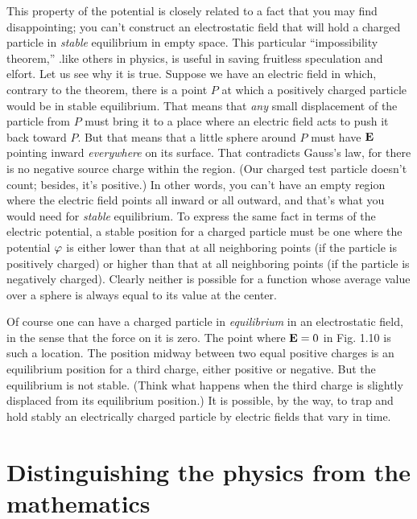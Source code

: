 This property of the potential is closely related to a fact that you
may find disappointing; you can't construct an electrostatic field that
will hold a charged particle in \emph{stable} equilibrium in empty space.
This particular ``impossibility theorem,'' .like others in physics, is
useful in saving fruitless speculation and elfort. Let us see why it
is true. Suppose we have an electric field in which, contrary to the
theorem, there is a point $P$ at which a positively charged particle
would be in stable equilibrium. That means that \emph{any} small displacement
of the particle from $P$ must bring it to a place where an electric
field acts to push it back toward $P$. But that means that a little sphere
around $P$ must have $\mathbf{E}$ pointing inward \emph{everywhere} on its surface.
That contradicts Gauss's law, for there is no negative source charge
within the region. (Our charged test particle doesn't count; besides,
it's positive.) In other words, you can't have an empty region where
the electric field points all inward or all outward, and that's what you
would need for \emph{stable} equilibrium. To express the same fact in terms
of the electric potential, a stable position for a charged particle must
be one where the potential $\varphi$ is either lower than that at all neighboring
points (if the particle is positively charged) or higher than that
at all neighboring points (if the particle is negatively charged).
Clearly neither is possible for a function whose average value over a
sphere is always equal to its value at the center.

Of course one can have a charged particle in \emph{equilibrium} in an electrostatic
field, in the sense that the force on it is zero. The point
where $\mathbf{E} = 0$ in Fig. 1.10 is such a location. The position midway
between two equal positive charges is an equilibrium position for a
third charge, either positive or negative. But the equilibrium is not
stable. (Think what happens when the third charge is slightly displaced
from its equilibrium position.) It is possible, by the way,
to trap and hold stably an electrically charged particle by electric
fields that vary in time.

\section{Distinguishing the physics from the mathematics}


